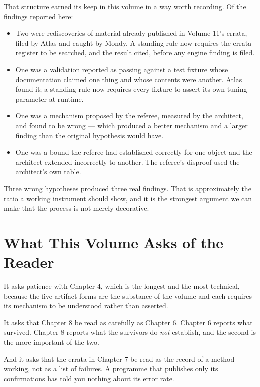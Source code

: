 \documentclass[11pt, letterpaper, openany]{book}
\begin{document}
That structure earned its keep in this volume in a way worth recording. Of the findings
reported here:

\begin{itemize}
    \item Two were rediscoveries of material already published in Volume 11's errata, filed by
          Atlas and caught by Mondy. A standing rule now requires the errata register to be
          searched, and the result cited, before any engine finding is filed.
    \item One was a validation reported as passing against a test fixture whose documentation
          claimed one thing and whose contents were another. Atlas found it; a standing rule now
          requires every fixture to assert its own tuning parameter at runtime.
    \item One was a mechanism proposed by the referee, measured by the architect, and found to
          be wrong --- which produced a better mechanism and a larger finding than the original
          hypothesis would have.
    \item One was a bound the referee had established correctly for one object and the architect
          extended incorrectly to another. The referee's disproof used the architect's own table.
\end{itemize}

\noindent Three wrong hypotheses produced three real findings. That is approximately the ratio
a working instrument should show, and it is the strongest argument we can make that the
process is not merely decorative.

\section*{What This Volume Asks of the Reader}

It asks patience with Chapter 4, which is the longest and the most technical, because the five
artifact forms are the substance of the volume and each requires its mechanism to be understood
rather than asserted.

It asks that Chapter 8 be read as carefully as Chapter 6. Chapter 6 reports what survived.
Chapter 8 reports what the survivors do \emph{not} establish, and the second is the more
important of the two.

And it asks that the errata in Chapter 7 be read as the record of a method working, not as a
list of failures. A programme that publishes only its confirmations has told you nothing about
its error rate.
\end{document}
